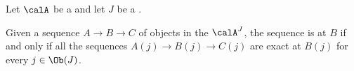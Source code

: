 \begin{proposition} \label{proposition:exact_sequence_in_a_diagram_category_of_an_abelian_category_indexed_by_a_small_category_is_given_by_componentwise_exact_sequences}
    Let $\calA$ be a  and let $J$ be a . 

    Given a sequence $A \to B \to C$ of objects in the  $\calA^J$, the sequence is  at $B$ if and only if all the sequences $A(j) \to B(j) \to C(j)$ are exact at $B(j)$ for every $j \in \Ob(J)$. 
\end{proposition}
